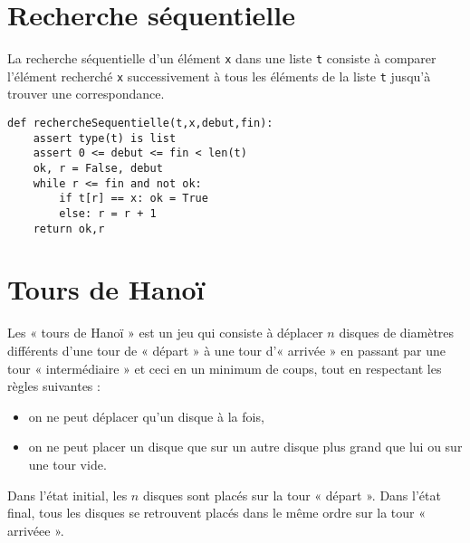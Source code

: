 \section*{Recherche séquentielle}
La recherche séquentielle d'un élément {\tt x} dans une liste {\tt t} 
consiste à comparer l'élément recherché {\tt x} successivement à tous les 
éléments de la liste {\tt t} jusqu'à trouver une correspondance.

\newpage
{}
\begin{lstlisting}[caption={\bf Recherche séquentielle},label=cl:rechercheSequentielle]
def rechercheSequentielle(t,x,debut,fin):
    assert type(t) is list
    assert 0 <= debut <= fin < len(t)
    ok, r = False, debut
    while r <= fin and not ok:
        if t[r] == x: ok = True
        else: r = r + 1
    return ok,r
\end{lstlisting}

\section*{Tours de Hanoï}
Les « tours de Hanoï » est un jeu qui
consiste à déplacer $n$ disques de diamètres différents d'une 
tour de « départ » à une tour d'« arrivée » en passant par une 
tour « intermédiaire » et ceci en un minimum de coups, 
tout en respectant les règles suivantes :
\begin{itemize}
\item on ne peut déplacer qu'un disque à la fois,
\item on ne peut placer un disque que sur un autre disque 
	plus grand que lui ou sur une tour vide.
\end{itemize}
Dans l'état initial, les $n$ disques sont placés sur la tour
« départ ». Dans l'état final, tous les disques se retrouvent
placés dans le même ordre sur la tour « arrivéee ».

